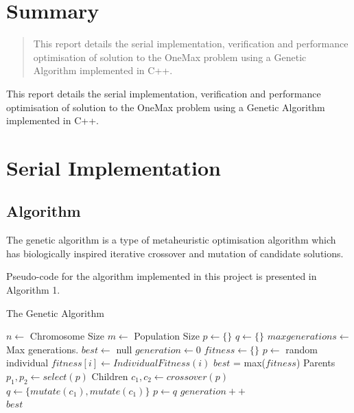 \documentclass{article}
\begin{document}



\section{Summary}
\begin{abstract}
This report details the serial implementation, verification and performance optimisation of solution to the OneMax problem using a Genetic Algorithm implemented in C++.
\end{abstract}
This report details the serial implementation, verification and performance optimisation of solution to the OneMax problem using a Genetic Algorithm implemented in C++. 

\section{Serial Implementation} 
\subsection{Algorithm} 
The genetic algorithm is a type of metaheuristic optimisation algorithm which has biologically inspired iterative crossover and mutation of candidate solutions. 

Pseudo-code for the algorithm implemented in this project is presented in  Algorithm 1. 

\begin{algorithm}
\caption{The Genetic Algorithm}\label{alg:cap}
\begin{algorithmic}

\State $n \gets $ Chromosome Size
\State $m \gets $ Population Size
\State $p \gets \lbrace\rbrace$  
\State $q \gets \lbrace\rbrace$  
\State $maxgenerations \gets $ Max generations.
\State $best \gets $ null
\State $generation \gets 0$ 
\State $fitness \gets \lbrace\rbrace$ 
	\State $p \gets$ random individual 
\EndFor
{}
	\State $fitness[i] \gets IndividualFitness(i)$
\EndFor
\State $best$ = max($fitness$)
\State Parents $p_1, p_2\gets select(p)$ 
\State Children $c_1, c_2\gets crossover(p)$ 
\State  $q\gets \lbrace mutate(c_1),mutate(c_1)\rbrace$ 
\EndFor
\State  $p\gets q$
\State $generation++$
\EndWhile \\
\Return $best$
\end{algorithmic}
\end{algorithm}
\end{document}
